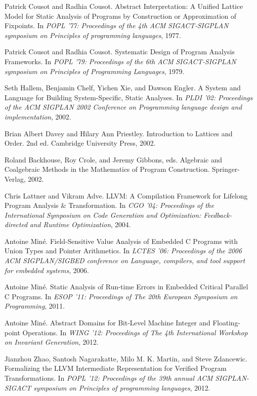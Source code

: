 \documentclass[a4paper]{book}
\begin{document}
\cleardoublepage
{}
\begin{thebibliography}{9}

 Patrick Cousot and Radhia Cousot.  Abstract
  Interpretation: A Unified Lattice Model for Static Analysis of
  Programs by Construction or Approximation of Fixpoints.  In
  \emph{POPL '77: Proceedings of the 4th ACM SIGACT-SIGPLAN symposium
    on Principles of programming languages}, 1977.

 Patrick Cousot and Radhia Cousot.  Systematic Design of
  Program Analysis Frameworks.  In \emph{POPL '79: Proceedings of the
    6th ACM SIGACT-SIGPLAN symposium on Principles of Programming
    Languages}, 1979.

 Seth Hallem, Benjamin Chelf, Yichen Xie, and Dawson
  Engler.  A System and Language for Building System-Specific, Static
  Analyses.  In \emph{PLDI '02: Proceedings of the ACM SIGPLAN 2002
    Conference on Programming language design and implementation},
  2002.

 Brian Albert Davey and Hilary Ann
  Priestley. Introduction to Lattices and Order. 2nd ed. Cambridge
  University Press, 2002.

 Roland Backhouse, Roy Crole, and Jeremy Gibbons, eds.
  Algebraic and Coalgebraic Methods in the Mathematics of Program
  Construction.  Springer-Verlag, 2002.

 Chris Lattner and Vikram Adve.  LLVM: A Compilation
  Framework for Lifelong Program Analysis \& Transformation. In
  \emph{CGO '04: Proceedings of the International Symposium on Code
    Generation and Optimization: Feedback-directed and Runtime
    Optimization}, 2004.

 Antoine Miné.  Field-Sensitive Value Analysis of
  Embedded C Programs with Union Types and Pointer Arithmetics.  In
  \emph{LCTES '06: Proceedings of the 2006 ACM SIGPLAN/SIGBED
    conference on Language, compilers, and tool support for embedded
    systems}, 2006.

 Antoine Miné.  Static Analysis of Run-time Errors in
  Embedded Critical Parallel C Programs.  In \emph{ESOP '11:
    Proceedings of The 20th European Symposium on Programming}, 2011.

 Antoine Miné.  Abstract Domains for Bit-Level Machine
  Integer and Floating-point Operations.  In \emph{WING '12:
    Proceedings of The 4th International Workshop on Invariant
    Generation}, 2012.

 Jianzhou Zhao, Santosh Nagarakatte, Milo
  M. K. Martin, and Steve Zdancewic.  Formalizing the LLVM
  Intermediate Representation for Verified Program Transformations. In
  \emph{POPL '12: Proceedings of the 39th annual ACM SIGPLAN-SIGACT
    symposium on Principles of programming languages}, 2012.

\end{thebibliography}

\clearpage
{}
\printindex
\end{document}
